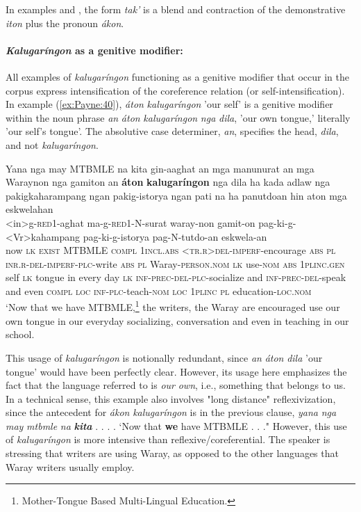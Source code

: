 \documentclass[output=paper]{langscibook}
\begin{document}
In examples  and , the form \textit{tak'} is a blend and contraction of the demonstrative \textit{iton} plus the pronoun \textit{ákon}. 

\paragraph*{\textit{Kalugaríngon} {as} {a} {genitive} {modifier:}} All examples of \textit{kalugaríngon} functioning as a genitive modifier that occur in the corpus express intensification of the coreference relation (or self-intensification). In example (\ref{ex:Payne:40}), \textit{áton} \textit{kalugaríngon} 'our self' is a genitive modifier within the noun phrase \textit{an} \textit{áton} \textit{kalugaríngon} \textit{nga} \textit{dila}, 'our own tongue,' literally 'our self's tongue'. The absolutive case determiner, \textit{an}, specifies the head, \textit{dila}, and not \textit{kalugaríngon}. 

\ea
\label{ex:Payne:40}
\glll
Yana nga may MTBMLE na kita gin-aaghat an mga manunurat an mga Waraynon nga gamiton an \textbf{áton} \textbf{kalugaríngon} nga dila ha kada adlaw nga pakigkaharampang ngan pakig-istorya ngan pati na ha panutdoan hin aton mga eskwelahan\\
{ } { } { } { } { } { } <in>g-\textsc{red}1-aghat { } { } ma-g-\textsc{red}1-N-surat { } { } waray-non { } gamit-on { } { } { } { } { } { } { } { } { } pag-ki-g-<Vr>kahampang { } pag-ki-g-istorya { } { } { } { } pag-N-tutdo-an { } { } { } eskwela-an\\
now \textsc{lk} \textsc{exist} MTBMLE \textsc{compl} 1\textsc{incl.abs} <\textsc{tr.r}>\textsc{del-imperf}-encourage\textsc{} \textsc{abs} \textsc{pl} \textsc{inr.r-del-imperf-plc-}write \textsc{abs} \textsc{pl} Waray-\textsc{person.nom} \textsc{lk} use-\textsc{nom} \textsc{abs} 1\textsc{plinc.gen} self \textsc{lk} tongue in every day \textsc{lk} \textsc{inf-prec}-\textsc{del-plc}-socialize and \textsc{inf-prec-del}-speak and
even \textsc{compl} \textsc{loc} \textsc{inf}-\textsc{plc}-teach-\textsc{nom} \textsc{loc} 1\textsc{plinc} \textsc{pl} education-\textsc{loc.nom}\\
\glt ‘Now that we have MTBMLE,\footnote{Mother-Tongue Based Multi-Lingual Education.} the writers, the Waray are encouraged use our own tongue in our everyday socializing, conversation and even in teaching in our school.
\z

This usage of \textit{kalugaríngon} is notionally redundant, since \textit{an} \textit{áton} \textit{dila} 'our tongue' would have been perfectly clear. However, its usage here emphasizes the fact that the language referred to is \textit{our} \textit{own\-}, i.e., something that belongs to us. In a technical sense, this example also involves "long distance" reflexivization, since the antecedent for \textit{ákon} \textit{kalugaríngon} is in the previous clause, \textit{yana} \textit{nga} \textit{may} \textit{mtbmle} \textit{na} \textbf{\textit{kita}} . . . . ‘Now that \textbf{we} have MTBMLE . . ." However, this use of \textit{kalugaríngon} is more intensive than reflexive/coreferential. The speaker is stressing that writers are using Waray, as opposed to the other languages that Waray writers usually employ. 
\end{document}
